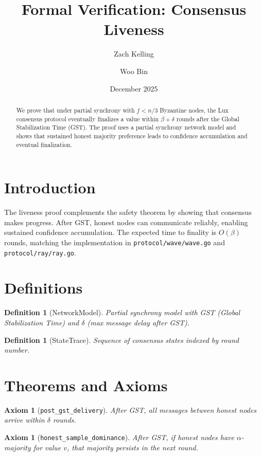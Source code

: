 \documentclass[11pt]{article}
\title{Formal Verification: Consensus Liveness}
\author{Zach Kelling \and Woo Bin}
\date{December 2025}
\newtheorem{definition}[theorem]{Definition}
\newtheorem{axiom_stmt}[theorem]{Axiom}
\begin{document}
\maketitle

\begin{abstract}
We prove that under partial synchrony with $f < n/3$ Byzantine nodes, the Lux consensus protocol eventually finalizes a value within $\beta + \delta$ rounds after the Global Stabilization Time (GST). The proof uses a partial synchrony network model and shows that sustained honest majority preference leads to confidence accumulation and eventual finalization.
\end{abstract}

\section{Introduction}
The liveness proof complements the safety theorem by showing that consensus makes progress. After GST, honest nodes can communicate reliably, enabling sustained confidence accumulation. The expected time to finality is $O(\beta)$ rounds, matching the implementation in \texttt{protocol/wave/wave.go} and \texttt{protocol/ray/ray.go}.

\section{Definitions}
\begin{definition}[NetworkModel]
Partial synchrony model with GST (Global Stabilization Time) and $\delta$ (max message delay after GST).
\end{definition}

\begin{definition}[StateTrace]
Sequence of consensus states indexed by round number.
\end{definition}


\section{Theorems and Axioms}
\begin{axiom_stmt}[\texttt{post\_gst\_delivery}]
After GST, all messages between honest nodes arrive within $\delta$ rounds.
\end{axiom_stmt}

\begin{axiom_stmt}[\texttt{honest\_sample\_dominance}]
After GST, if honest nodes have $\alpha$-majority for value $v$, that majority persists in the next round.
\end{axiom_stmt}
\end{document}
